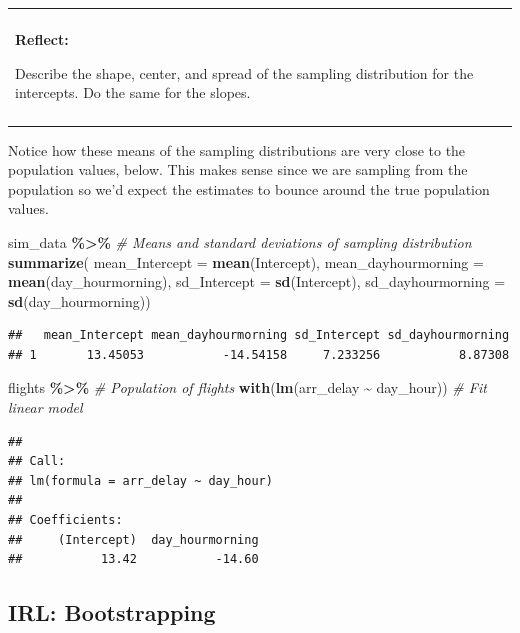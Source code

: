 \documentclass[
]{book}
\newenvironment{Shaded}{\begin{snugshade}}{\end{snugshade}}
\newcommand{\AttributeTok}[1]{\textcolor[rgb]{0.13,0.29,0.53}{#1}}
\newcommand{\CommentTok}[1]{\textcolor[rgb]{0.56,0.35,0.01}{\textit{#1}}}
\newcommand{\FunctionTok}[1]{\textcolor[rgb]{0.13,0.29,0.53}{\textbf{#1}}}
\newcommand{\NormalTok}[1]{#1}
\newcommand{\SpecialCharTok}[1]{\textcolor[rgb]{0.81,0.36,0.00}{\textbf{#1}}}
\newenvironment{reflect}
{
    \begin{center}
    
    \begin{tabular}{|p{0.8\textwidth}|}
    \rowcolor{LightBlue}
    \hline\\
    \rowcolor{LightBlue}
    \textbf{Reflect:}
}
{
    \\\rowcolor{LightBlue}
    \\\hline
    \end{tabular} 
    \end{center}
}
\begin{document}
\begin{reflect}
Describe the shape, center, and spread of the sampling distribution for
the intercepts. Do the same for the slopes.
\end{reflect}

Notice how these means of the sampling distributions are very close to the population values, below. This makes sense since we are sampling from the population so we'd expect the estimates to bounce around the true population values.

\begin{Shaded}
\begin{Highlighting}[]
\NormalTok{sim\_data }\SpecialCharTok{\%\textgreater{}\%} \CommentTok{\# Means and standard deviations of sampling distribution}
    \FunctionTok{summarize}\NormalTok{(}
        \AttributeTok{mean\_Intercept =} \FunctionTok{mean}\NormalTok{(Intercept),}
        \AttributeTok{mean\_dayhourmorning =} \FunctionTok{mean}\NormalTok{(day\_hourmorning),}
        \AttributeTok{sd\_Intercept =} \FunctionTok{sd}\NormalTok{(Intercept),}
        \AttributeTok{sd\_dayhourmorning =} \FunctionTok{sd}\NormalTok{(day\_hourmorning))}
\end{Highlighting}
\end{Shaded}

\begin{verbatim}
##   mean_Intercept mean_dayhourmorning sd_Intercept sd_dayhourmorning
## 1       13.45053           -14.54158     7.233256           8.87308
\end{verbatim}

\begin{Shaded}
\begin{Highlighting}[]
\NormalTok{flights }\SpecialCharTok{\%\textgreater{}\%} \CommentTok{\# Population of flights}
    \FunctionTok{with}\NormalTok{(}\FunctionTok{lm}\NormalTok{(arr\_delay }\SpecialCharTok{\textasciitilde{}}\NormalTok{ day\_hour)) }\CommentTok{\# Fit linear model}
\end{Highlighting}
\end{Shaded}

\begin{verbatim}
## 
## Call:
## lm(formula = arr_delay ~ day_hour)
## 
## Coefficients:
##     (Intercept)  day_hourmorning  
##           13.42           -14.60
\end{verbatim}

\subsection{IRL: Bootstrapping}\label{irl-bootstrapping}
\end{document}
